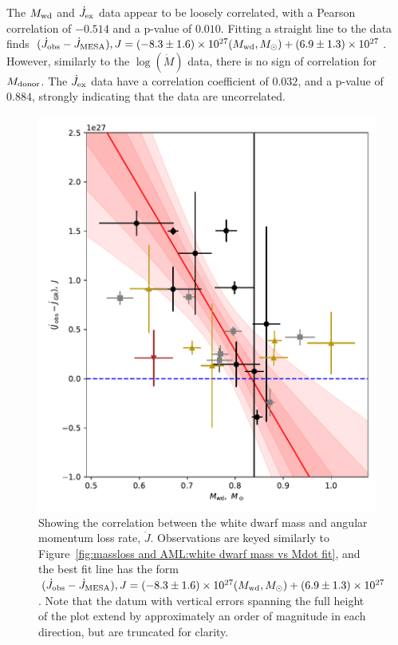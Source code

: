 The $M_{\rm wd}$ and $\dot J_{\rm ex}$ data appear to be loosely correlated, with a Pearson correlation of $-0.514$ and a p-value of $0.010$. Fitting a straight line to the data finds $(\dot J_{\rm obs} - \dot J_{\rm MESA}), J = (-8.3\pm1.6) \times 10^{27}(M_{\rm wd}, M_\odot) + (6.9\pm1.3)\times10^{27}$.
However, similarly to the $\log (\dot M)$ data, there is no sign of correlation for $M_{\rm donor}$. The $\dot J_{\rm ex}$ data have a correlation coefficient of $0.032$, and a p-value of $0.884$, strongly indicating that the data are uncorrelated.

\begin{figure}
    \centering
    \includegraphics[width=\textwidth]{figures/results/Mdot/Mwd_Jdot_ex.pdf}
    \caption{Showing the correlation between the white dwarf mass and angular momentum loss rate, $\dot J$. Observations are keyed similarly to Figure~\ref{fig:massloss and AML:white dwarf mass vs Mdot fit}, and the best fit line has the form $(\dot J_{\rm obs} - \dot J_{\rm MESA}), J = (-8.3\pm1.6) \times 10^{27}(M_{\rm wd}, M_\odot) + (6.9\pm1.3)\times10^{27}$. Note that the datum with vertical errors spanning the full height of the plot extend by approximately an order of magnitude in each direction, but are truncated for clarity.}
    \label{fig:massloss and AML:white dwarf mass vs Jdot fit}
\end{figure}
